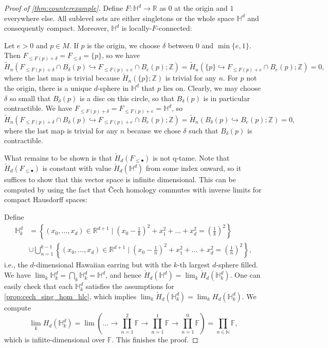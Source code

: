 \documentclass{amsart}
\theoremstyle{plain}
\theoremstyle{definition}
\newcommand\CH{\check{H}}
\begin{document}
\begin{proof}[Proof of \cref{thm:counterexample}]
Define $F\colon\mathbb{H}^{d}\to\mathbb{R}$ as $0$ at the origin and $1$ everywhere else. All sublevel sets are either singletons or the whole space $\mathbb{H}^{d}$ and consequently compact. Moreover, $\mathbb{H}^{d}$ is locally-$F$-connected: 

Let $e>0$ and $p\in M$. If $p$ is the origin, we choose $\delta$ between 0 and $\min\{e,1\}$. Then $F_{\leq F(p)+\delta}=F_{\leq\delta}=\{p\}$, so we have 
\[
\tilde{H}_n(F_{\leq F(p)+\delta}\cap B_{\delta}(p)\hookrightarrow F_{\leq F(p)+e}\cap B_e(p);\mathbb{Z})=\tilde{H}_n(\{p\}\hookrightarrow F_{\leq F(p)+e}\cap B_e(p);\mathbb{Z})=0,
\]
where the last map is trivial because $\tilde{H}_{n}(\{p\};\mathbb{Z})$ is trivial for any $n$. For $p$ not the origin, there is a unique $d$-sphere in $\mathbb{H}^{d}$ that $p$ lies on. Clearly, we may choose $\delta$ so small that $B_{\delta}(p)$ is a disc on this circle, so that $B_{\delta}(p)$ is in particular contractible. We have $F_{\leq F(p)+\delta}=F_{\leq F(p)+e}=\mathbb{H}^{d}$, so 
\[
\tilde{H}_n(F_{\leq F(p)+\delta}\cap B_{\delta}(p)\hookrightarrow F_{\leq F(p)+e}\cap B_e(p);\mathbb{Z})=\tilde{H}_n(B_{\delta}(p)\hookrightarrow B_e(p);\mathbb{Z})=0,
\]
where the last map is trivial for any $n$ because we chose $\delta$ such that $B_{\delta}(p)$ is contractible.

What remains to be shown is that $\CH_d(F_{\leq\bullet})$ is not q-tame. Note that $\CH_d(F_{\leq\bullet})$ is constant with value $\CH_{d}(\mathbb{H}^{d})$ from some index onward, so it suffices to show that this vector space is infinite dimensional. This can be computed by using the fact that \v{C}ech homology commutes with inverse limits for compact Hausdorff spaces: 

Define 
\begin{align*}
\mathbb{H}^{d}_k&=\left\{(x_0,\dots,x_d)\in\mathbb{R}^{d+1}\mid \left(x_0-\frac{1}{k}\right)^2+x_1^2+\dots+x_d^2=\left(\frac{1}{k}\right)^2\right\}\\
&\cup\bigcup_{n=1}^{k-1}\left\{(x_0,\dots,x_d)\in\mathbb{R}^{d+1}\mid \left(x_0-\frac{1}{n}\right)^2+x_1^2+\dots+x_d^2=\left(\frac{1}{n}\right)^2\right\},
\end{align*}
i.e., the $d$-dimensional Hawaiian earring but with the $k$-th largest $d$-sphere filled. We have $\lim_{k}\mathbb{H}^{d}_{k}=\bigcap_{k}\mathbb{H}^{d}_{k}=\mathbb{H}^{d}$, and hence $\CH_{d}(\mathbb{H}^{d})=\lim_{k}\CH_{d}(\mathbb{H}^{d}_{k})$. One can easily check that each $\mathbb{H}^{d}_{k}$ satisfies the assumptions for \cref{prop:cech_sing_hom_hlc}, which implies $\lim_{k}\CH_{d}(\mathbb{H}^{d}_{k})=\lim_{k}H_{d}(\mathbb{H}^{d}_{k})$. We compute
\[
\lim_{k}H_{d}(\mathbb{H}^{d}_{k})=\lim\left(\dots\to \prod_{n=1}^2\mathbb{F}\to \prod_{n=1}^1\mathbb{F}\to \prod_{n=1}^0\mathbb{F}\right)=\prod_{n\in\mathbb{N}}\mathbb{F},
\]
which is infiite-dimensional over $\mathbb{F}$. This finishes the proof.
\end{proof}
\end{document}
